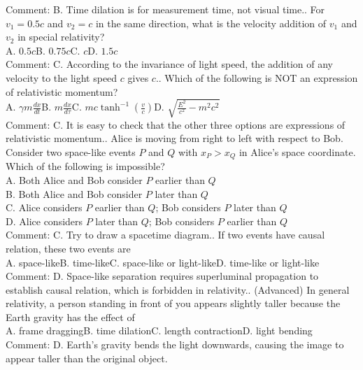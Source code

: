 \documentclass[12pt]{book} %
\numberwithin{equation}{chapter}
\def\c{\gamma}
\def\t{\tau}
\def\mc{\hspace{0.5cm}}
\begin{document}
Comment: B. Time dilation is for measurement time, not visual time.\bigskip{}. For $v_{1}=0.5c$ and $v_{2}=c$ in the same direction, what is the velocity addition of $v_{1}$ and $v_{2}$ in special relativity?\\
A. $0.5c$\mc B. $0.75c$\mc C. $c$\mc D. $1.5c$\\
Comment: C. According to the invariance of light speed, the addition of any velocity to the light speed $c$ gives $c$.\bigskip{}. Which of the following is NOT an expression of relativistic momentum?\\
A. $\c m\frac{dx}{dt}$\mc B. $m\frac{dx}{d\t}$\mc C. $mc\tanh^{-1}\left(\frac{v}{c}\right)$\mc D. $\sqrt{\frac{E^{2}}{c^{2}}-m^{2}c^{2}}$\\
Comment: C. It is easy to check that the other three options are expressions of relativistic momentum.\bigskip{}. Alice is moving from right to left with respect to Bob. Consider two space-like events $P$ and $Q$ with $x_{P}>x_{Q}$ in Alice's space coordinate. Which of the following is impossible?\\
A. Both Alice and Bob consider $P$ earlier than $Q$\\
B. Both Alice and Bob consider $P$ later than $Q$\\
C. Alice considers $P$ earlier than $Q$; Bob considers $P$ later than $Q$\\
D. Alice considers $P$ later than $Q$; Bob considers $P$ earlier than $Q$\\
Comment: C. Try to draw a spacetime diagram.\bigskip{}. If two events have causal relation, these two events are\\
A. space-like\mc B. time-like\mc C. space-like or light-like\mc D. time-like or light-like\\
Comment: D. Space-like separation requires superluminal propagation to establish causal relation, which is forbidden in relativity.\bigskip{}. (Advanced) In general relativity, a person standing in front of you appears slightly taller because the Earth gravity has the effect of\\
A. frame dragging\mc B. time dilation\mc C. length contraction\mc D. light bending\\
Comment: D. Earth's gravity bends the light downwards, causing the image to appear taller than the original object.\bigskip\newline
\end{document}
